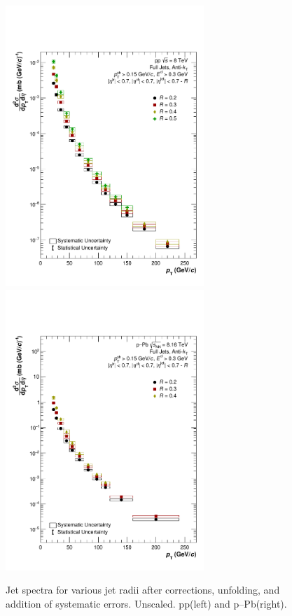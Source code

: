 \documentclass[ALICE]{ALICE_analysis_notes}
\newcommand{\pPb}{{\mbox{p--Pb}}\xspace}
\newcommand{\pp}{pp\xspace}
\begin{document}
\begin{figure}
    \centering
    \includegraphics[width=7.5cm]{figures/FinalResults/Bayes_reg6_unscaled.pdf}
    \includegraphics[width=7.5cm]{figures/pPbFigures/FinalResults/Bayes_reg6_unscaled.pdf}
    \caption{Jet spectra for various jet radii after corrections, unfolding, and addition of systematic errors. Unscaled. \pp (left) and \pPb (right).}
    \label{fig:finalSpectraUnscaled}
\end{figure}
\end{document}
